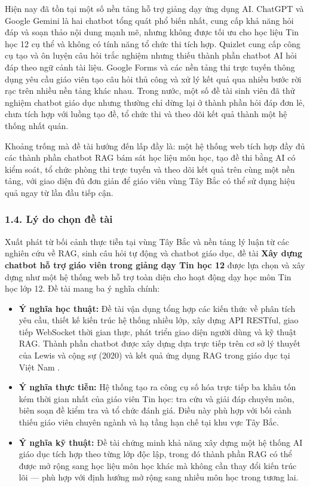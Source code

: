 \documentclass[12pt,a4paper]{article}
\begin{document}
	Hiện nay đã tồn tại một số nền tảng hỗ trợ giảng dạy ứng dụng AI. ChatGPT và Google Gemini là hai chatbot tổng quát phổ biến nhất, cung cấp khả năng hỏi đáp và soạn thảo nội dung mạnh mẽ, nhưng không được tối ưu cho học liệu Tin học 12 cụ thể và không có tính năng tổ chức thi tích hợp. Quizlet cung cấp công cụ tạo và ôn luyện câu hỏi trắc nghiệm nhưng thiếu thành phần chatbot AI hỏi đáp theo ngữ cảnh tài liệu. Google Forms và các nền tảng thi trực tuyến thông dụng yêu cầu giáo viên tạo câu hỏi thủ công và xử lý kết quả qua nhiều bước rời rạc trên nhiều nền tảng khác nhau. Trong nước, một số đề tài sinh viên đã thử nghiệm chatbot giáo dục nhưng thường chỉ dừng lại ở thành phần hỏi đáp đơn lẻ, chưa tích hợp với luồng tạo đề, tổ chức thi và theo dõi kết quả thành một hệ thống nhất quán.
	
	Khoảng trống mà đề tài hướng đến lấp đầy là: một hệ thống web tích hợp đầy đủ các thành phần chatbot RAG bám sát học liệu môn học, tạo đề thi bằng AI có kiểm soát, tổ chức phòng thi trực tuyến và theo dõi kết quả trên cùng một nền tảng, với giao diện đủ đơn giản để giáo viên vùng Tây Bắc có thể sử dụng hiệu quả ngay từ lần đầu tiếp cận.
	
	\subsubsection*{1.4. Lý do chọn đề tài}
	
	Xuất phát từ bối cảnh thực tiễn tại vùng Tây Bắc và nền tảng lý luận từ các nghiên cứu về RAG, sinh câu hỏi tự động và chatbot giáo dục, đề tài \textbf{Xây dựng chatbot hỗ trợ giáo viên trong giảng dạy Tin học 12} được lựa chọn và xây dựng như một hệ thống web hỗ trợ toàn diện cho hoạt động dạy học môn Tin học lớp 12. Đề tài mang ba ý nghĩa chính:
	
	\begin{itemize}[leftmargin=1.5cm]
		\item \textbf{Ý nghĩa học thuật:} Đề tài vận dụng tổng hợp các kiến thức về phân tích yêu cầu, thiết kế kiến trúc hệ thống nhiều lớp, xây dựng API RESTful, giao tiếp WebSocket thời gian thực, phát triển giao diện người dùng và kỹ thuật RAG. Thành phần chatbot được xây dựng dựa trực tiếp trên cơ sở lý thuyết của Lewis và cộng sự (2020) \cite{lewis2020rag} và kết quả ứng dụng RAG trong giáo dục tại Việt Nam \cite{nguyen2025rag}.
		\item \textbf{Ý nghĩa thực tiễn:} Hệ thống tạo ra công cụ số hóa trực tiếp ba khâu tốn kém thời gian nhất của giáo viên Tin học: tra cứu và giải đáp chuyên môn, biên soạn đề kiểm tra và tổ chức đánh giá. Điều này phù hợp với bối cảnh thiếu giáo viên chuyên ngành và hạ tầng hạn chế tại khu vực Tây Bắc.
		\item \textbf{Ý nghĩa kỹ thuật:} Đề tài chứng minh khả năng xây dựng một hệ thống AI giáo dục tích hợp theo từng lớp độc lập, trong đó thành phần RAG có thể được mở rộng sang học liệu môn học khác mà không cần thay đổi kiến trúc lõi --- phù hợp với định hướng mở rộng sang nhiều môn học trong tương lai.
	\end{itemize}
	
\end{document}
